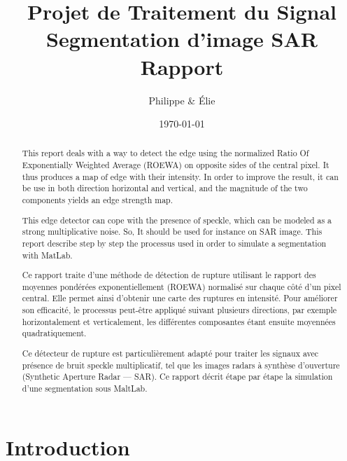 \documentclass[a4paper,11pt]{article}
\title{Projet de Traitement du Signal\\Segmentation d'image SAR\\Rapport}
\author{Philippe \bsc{Tran Ba} \& Élie \bsc{Bouttier}}
\date\today
\begin{document}
\maketitle

\vspace{2cm}

\begin{abstract}

This report deals with a way to detect the edge using the normalized Ratio Of Exponentially Weighted Average (ROEWA) on opposite sides of the central pixel. It thus produces a map of edge with their intensity. In order to improve the result, it can be use in both direction horizontal and vertical, and the magnitude of the two components yields an edge strength map.

This edge detector can cope with the presence of speckle, which can be modeled as a strong multiplicative noise. So, It should be used for instance on SAR image. This report describe step by step the processus used in order to simulate a segmentation with MatLab.

\end{abstract}

\vspace{1cm}

\begin{abstract}

    Ce rapport traite d'une méthode de détection de rupture utilisant le rapport des moyennes pondérées exponentiellement (ROEWA) normalisé sur chaque côté d'un pixel central. Elle permet ainsi d'obtenir une carte des ruptures en intensité. Pour améliorer son efficacité, le processus peut-être appliqué suivant plusieurs directions, par exemple horizontalement et verticalement, les différentes composantes étant ensuite moyennées quadratiquement.

    Ce détecteur de rupture est particulièrement adapté pour traiter les signaux avec présence de bruit speckle multiplicatif, tel que les images radars à synthèse d'ouverture (Synthetic Aperture Radar — SAR). Ce rapport décrit étape par étape la simulation d'une segmentation sous MaltLab.

\end{abstract}

\newpage

\tableofcontents

\newpage

\section{Introduction}
\end{document}

